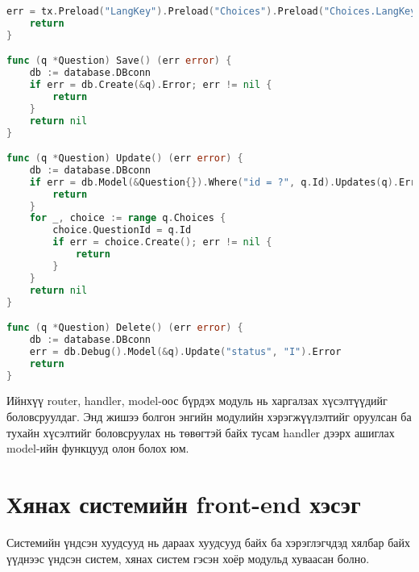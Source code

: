 \begin{lstlisting}[language=Go, caption=Модулийн Model, frame=single]
	err = tx.Preload("LangKey").Preload("Choices").Preload("Choices.LangKey").Order("ord").Order("id").Find(&res).Error
	return
}

func (q *Question) Save() (err error) {
	db := database.DBconn
	if err = db.Create(&q).Error; err != nil {
		return
	}
	return nil
}

func (q *Question) Update() (err error) {
	db := database.DBconn
	if err = db.Model(&Question{}).Where("id = ?", q.Id).Updates(q).Error; err != nil {
		return
	}
	for _, choice := range q.Choices {
		choice.QuestionId = q.Id
		if err = choice.Create(); err != nil {
			return
		}
	}
	return nil
}

func (q *Question) Delete() (err error) {
	db := database.DBconn
	err = db.Debug().Model(&q).Update("status", "I").Error
	return
}
\end{lstlisting}

Ийнхүү router, handler, model-оос бүрдэх модуль нь харгалзах хүсэлтүүдийг боловсруулдаг. Энд жишээ болгон энгийн модулийн хэрэгжүүлэлтийг оруулсан ба тухайн хүсэлтийг боловсруулах нь төвөгтэй байх тусам handler дээрх ашиглах model-ийн функцууд олон болох юм. 

\section{Хянах системийн front-end хэсэг}

Системийн үндсэн хуудсууд нь дараах хуудсууд байх ба хэрэглэгчдэд хялбар байх үүднээс үндсэн систем, хянах систем гэсэн хоёр модульд хуваасан болно.

